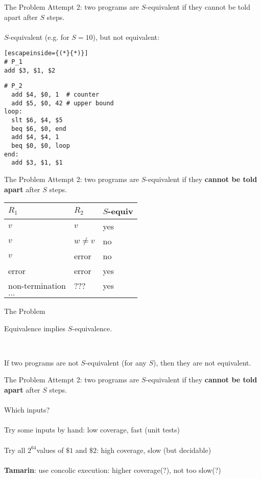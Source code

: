 \documentclass[pdf]{beamer}
\begin{document}
\begin{frame}[fragile]{The Problem}
Attempt 2: two programs are $S$-equivalent if they cannot be told apart after $S$ steps.
\pause
\\~\\
$S$-equivalent (e.g. for $S = 10$), but not equivalent:
\begin{multicols}{2}
\begin{lstlisting}[escapeinside={(*}{*)}]
# P_1
add $3, $1, $2
\end{lstlisting}
\vfill\null
\columnbreak
\begin{lstlisting}
# P_2
  add $4, $0, 1  # counter
  add $5, $0, 42 # upper bound
loop:
  slt $6, $4, $5 
  beq $6, $0, end
  add $4, $4, 1
  beq $0, $0, loop
end:
  add $3, $1, $1  
\end{lstlisting}
\end{multicols}
\end{frame}

\begin{frame}{The Problem}
Attempt 2: two programs are $S$-equivalent if they \textbf{cannot be told apart} after $S$ steps.
\vspace{1cm}

\begin{tabular}{l | l | l}
$R_1$ & $R_2$ & $S$-equiv \\
\hline
\pause
$v$ & $v$ & yes \\
\pause
$v$ & $w \neq v$ & no \\
\pause
$v$ & error & no \\
\pause
error & error & yes \\
\pause
non-termination & ??? & yes \\
$\ldots$

\end{tabular}
\end{frame}

\begin{frame}{The Problem}
\begin{lemma}
Equivalence implies $S$-equivalence.
\end{lemma}

\pause
~\\
\begin{corollary}[Soundness]
If two programs are not $S$-equivalent (for any $S$), then they are not equivalent.
\end{corollary}
\end{frame}

\begin{frame}{The Problem}
Attempt 2: two programs are $S$-equivalent if they \textbf{cannot be told apart} after $S$ steps.
\\~\\
Which inputs?
\pause 
\\~\\
Try some inputs by hand: low coverage, fast (unit tests)
\pause
\\~\\
Try all $2^{64}$values of $\$1$ and $\$2$: high coverage, slow (but decidable)
\pause
\\~\\
\textbf{Tamarin}: use concolic execution: higher coverage(?), not too slow(?)
\end{frame}
\end{document}
